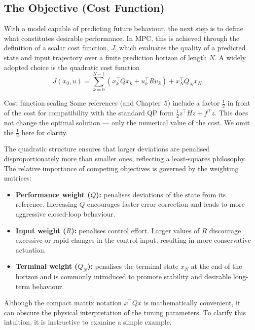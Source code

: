 \subsection{The Objective (Cost Function)}
With a model capable of predicting future behaviour, the next step is to define what constitutes desirable performance. In MPC, this is achieved through the definition of a scalar cost function, $J$, which evaluates the quality of a predicted state and input trajectory over a finite prediction horizon of length $N$. A widely adopted choice is the quadratic cost function
\begin{equation}
	J(x_0, {u}) = \sum_{k=0}^{N-1} \left( x_k^\top  Q x_k + u_k^\top  R u_k \right) + x_N^\top  Q_N x_N .
\end{equation}
\begin{notebox}{Cost function scaling}
Some references (and Chapter~5) include a factor $\tfrac{1}{2}$ in front of the cost for compatibility with the standard QP form $\tfrac{1}{2}z^\top H z + f^\top z$. This does not change the optimal solution --- only the numerical value of the cost. We omit the $\tfrac{1}{2}$ here for clarity.
\end{notebox}
The quadratic structure ensures that larger deviations are penalised disproportionately more than smaller ones, reflecting a least-squares philosophy. The relative importance of competing objectives is governed by the weighting matrices:
\begin{itemize}
	\item \textbf{Performance weight ($Q$):} penalises deviations of the state from its reference. Increasing $Q$ encourages faster error correction and leads to more aggressive closed-loop behaviour.
	\item \textbf{Input weight ($R$):} penalises control effort. Larger values of $R$ discourage excessive or rapid changes in the control input, resulting in more conservative actuation.
	\item \textbf{Terminal weight ($Q_N$):} penalises the terminal state $x_N$ at the end of the horizon and is commonly introduced to promote stability and desirable long-term behaviour.
\end{itemize}

Although the compact matrix notation $x^\top  Q x$ is mathematically convenient, it can obscure the physical interpretation of the tuning parameters. To clarify this intuition, it is instructive to examine a simple example.

